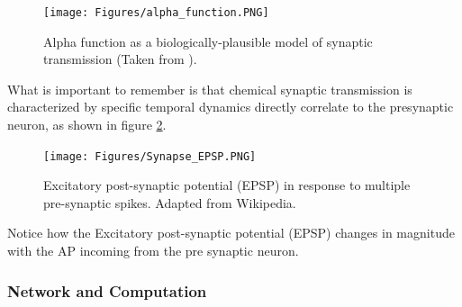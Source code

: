 \begin{figure}
 \centering
 \texttt{[image: Figures/alpha\_function.PNG]}
 \caption{Alpha function as a biologically-plausible model of synaptic transmission (Taken from \cite{comsa_temporal_2020}).}
 \label{fig:alpha_function}
\end{figure}


What is important to remember is that chemical synaptic transmission is characterized by specific temporal dynamics directly correlate to the presynaptic neuron, as shown in figure \ref{fig:Synapse_EPSP}.

\begin{figure}
    \centering
    \texttt{[image: Figures/Synapse\_EPSP.PNG]}
    \caption{Excitatory post-synaptic potential (EPSP) in response to multiple pre-synaptic spikes. Adapted from Wikipedia.}
    \label{fig:Synapse_EPSP}
\end{figure}

Notice how the Excitatory post-synaptic potential (EPSP) changes in magnitude with the AP incoming from the pre synaptic neuron. 







\subsubsection{Network and Computation}

